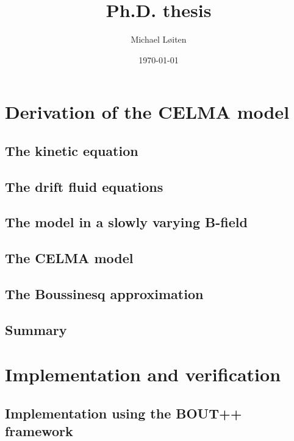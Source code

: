 \documentclass[12pt,a4paper,oneside,openright]{report} %
\title{\vspace{-8ex}Ph.D. thesis\vspace{-1ex}}
\author{Michael L{\o}iten}
\date{\vspace{-2ex}\today}
\begin{document}
\maketitle
%
\part{Derivation of the CELMA model}
\chapter{The kinetic equation}

%
\chapter{The drift fluid equations}
\label{chap:drift-order}


\chapter{The model in a slowly varying B-field}


\chapter{The CELMA model}
\label{chap:CELMA}






\chapter{The Boussinesq approximation}
\label{chap:boussinesq}

\chapter{Summary}


\part{Implementation and verification}
\chapter{Implementation using the BOUT++ framework}
\label{chap:implBOUT++}




\end{document}
